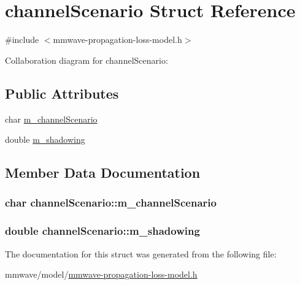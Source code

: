 \hypertarget{structchannelScenario}{}\section{channel\+Scenario Struct Reference}
\label{structchannelScenario}


{\ttfamily \#include $<$mmwave-\/propagation-\/loss-\/model.\+h$>$}



Collaboration diagram for channel\+Scenario\+:
\subsection*{Public Attributes}
\begin{DoxyCompactItemize}
\item 
char \hyperlink{structchannelScenario_adba9eb89f9bb89e643f8e254f0c84ca2}{m\+\_\+channel\+Scenario}
\item 
double \hyperlink{structchannelScenario_a1add7cf57d35dad246b30f36e08dcb9e}{m\+\_\+shadowing}
\end{DoxyCompactItemize}


\subsection{Member Data Documentation}
\subsubsection[{\texorpdfstring{m\+\_\+channel\+Scenario}{m_channelScenario}}]{\setlength{\rightskip}{0pt plus 5cm}char channel\+Scenario\+::m\+\_\+channel\+Scenario}\hypertarget{structchannelScenario_adba9eb89f9bb89e643f8e254f0c84ca2}{}\label{structchannelScenario_adba9eb89f9bb89e643f8e254f0c84ca2}
\subsubsection[{\texorpdfstring{m\+\_\+shadowing}{m_shadowing}}]{\setlength{\rightskip}{0pt plus 5cm}double channel\+Scenario\+::m\+\_\+shadowing}\hypertarget{structchannelScenario_a1add7cf57d35dad246b30f36e08dcb9e}{}\label{structchannelScenario_a1add7cf57d35dad246b30f36e08dcb9e}


The documentation for this struct was generated from the following file\+:\begin{DoxyCompactItemize}
\item 
mmwave/model/\hyperlink{mmwave-propagation-loss-model_8h}{mmwave-\/propagation-\/loss-\/model.\+h}\end{DoxyCompactItemize}
